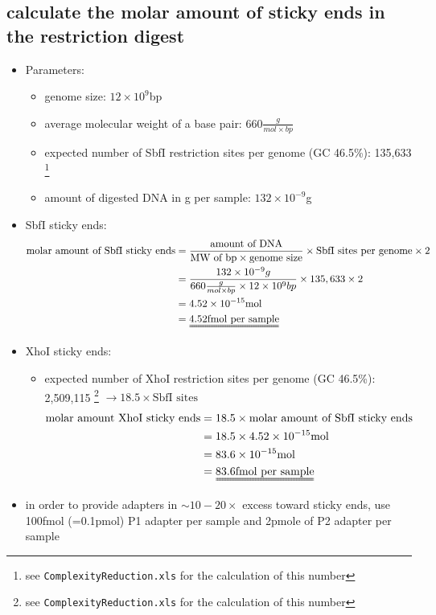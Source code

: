 \subsection
{calculate the molar amount of sticky ends in the restriction digest}
\begin{itemize}
\item Parameters:
	\begin{itemize}
	\item genome size: $12\times10^{9}$bp
	\item average molecular weight of a base pair: 660$\frac{g}{mol\times bp}$
	\item expected number of SbfI restriction sites per genome (GC 46.5\%): 135,633 \footnote{see \texttt{ComplexityReduction.xls} for the calculation of this number }
	\item amount of digested DNA in g per sample: $132\times 10^{-9}$g
	\end{itemize}

\item SbfI sticky ends:
\begin{align}
\text{molar amount of SbfI sticky ends} &= \frac{\text{amount of DNA}}{\text{MW of bp} \times \text{genome size} } \times \text{SbfI sites per genome} \times 2 \\ \nonumber 
							   &= \frac{132\times 10^{-9}g}{660 \frac{g}{mol\times bp} \times 12\times10^{9} bp} \times 135,633 \times 2\\ \nonumber
							   &= 4.52 \times 10^{-15} \text{mol}\\ \nonumber
							   &= \uuline{4.52 \text{fmol per sample}}
\end{align}

\item XhoI sticky ends:
	\begin{itemize}
	\item expected number of XhoI restriction sites per genome (GC 46.5\%): \\ 2,509,115 \footnote{see \texttt{ComplexityReduction.xls} for the calculation of this number } $\rightarrow 18.5 \times \text{SbfI sites}$ 
	\begin{align}
	\text{molar amount XhoI sticky ends} &= 18.5 \times \text{molar amount of SbfI sticky ends} \\ \nonumber
								&= 18.5 \times 4.52 \times 10^{-15} \text{mol} \\ \nonumber
								&= 83.6 \times 10^{-15} \text{mol} \\ \nonumber
								&= \uuline{83.6\text{fmol per sample}}
	\end{align}
	\end{itemize}
\item in order to provide adapters in $\sim10-20 \times$ excess toward sticky ends, use 100fmol (=0.1pmol) P1 adapter per sample and 2pmole of P2 adapter per sample
\end{itemize}

